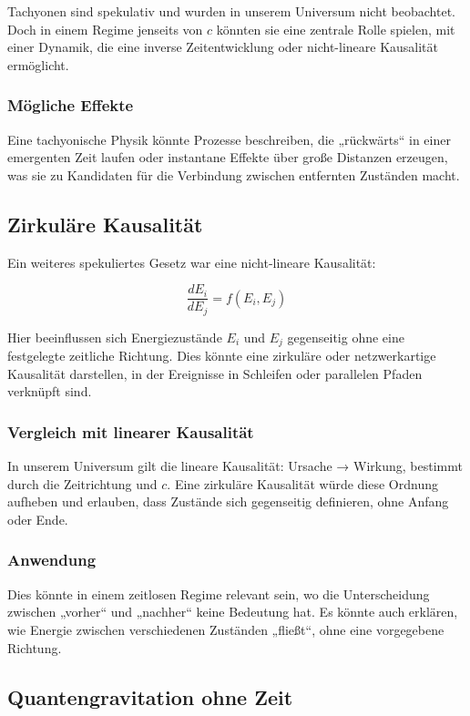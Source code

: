 \documentclass{article}
\begin{document}
	Tachyonen sind spekulativ und wurden in unserem Universum nicht beobachtet. Doch in einem Regime jenseits von \( c \) könnten sie eine zentrale Rolle spielen, mit einer Dynamik, die eine inverse Zeitentwicklung oder nicht-lineare Kausalität ermöglicht.
	
	\subsubsection{Mögliche Effekte}
	
	Eine tachyonische Physik könnte Prozesse beschreiben, die „rückwärts“ in einer emergenten Zeit laufen oder instantane Effekte über große Distanzen erzeugen, was sie zu Kandidaten für die Verbindung zwischen entfernten Zuständen macht.
	
	\subsection{Zirkuläre Kausalität}
	
	Ein weiteres spekuliertes Gesetz war eine nicht-lineare Kausalität:
	
	\[
	\frac{dE_i}{dE_j} = f(E_i, E_j)
	\]
	
	Hier beeinflussen sich Energiezustände \( E_i \) und \( E_j \) gegenseitig ohne eine festgelegte zeitliche Richtung. Dies könnte eine zirkuläre oder netzwerkartige Kausalität darstellen, in der Ereignisse in Schleifen oder parallelen Pfaden verknüpft sind.
	
	\subsubsection{Vergleich mit linearer Kausalität}
	
	In unserem Universum gilt die lineare Kausalität: Ursache → Wirkung, bestimmt durch die Zeitrichtung und \( c \). Eine zirkuläre Kausalität würde diese Ordnung aufheben und erlauben, dass Zustände sich gegenseitig definieren, ohne Anfang oder Ende.
	
	\subsubsection{Anwendung}
	
	Dies könnte in einem zeitlosen Regime relevant sein, wo die Unterscheidung zwischen „vorher“ und „nachher“ keine Bedeutung hat. Es könnte auch erklären, wie Energie zwischen verschiedenen Zuständen „fließt“, ohne eine vorgegebene Richtung.
	
	\subsection{Quantengravitation ohne Zeit}
	
\end{document}
